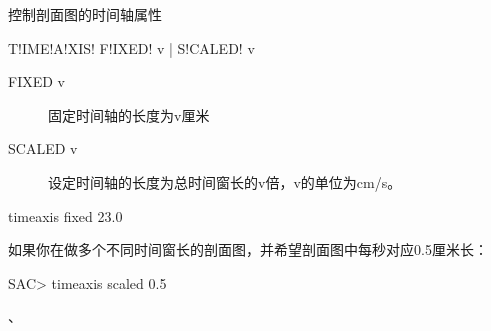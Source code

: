 \label{sss:timeaxis}

控制剖面图的时间轴属性

\begin{SACSTX}
T!IME!A!XIS! F!IXED! v | S!CALED! v
\end{SACSTX}

\begin{description}
\item [FIXED v] 固定时间轴的长度为v厘米
\item [SCALED v] 设定时间轴的长度为总时间窗长的v倍，v的单位为cm/s。
\end{description}

\begin{SACDFT}
timeaxis fixed 23.0
\end{SACDFT}

如果你在做多个不同时间窗长的剖面图，并希望剖面图中每秒对应0.5厘米长：
\begin{SACCode}
SAC> timeaxis scaled 0.5
\end{SACCode}

、
